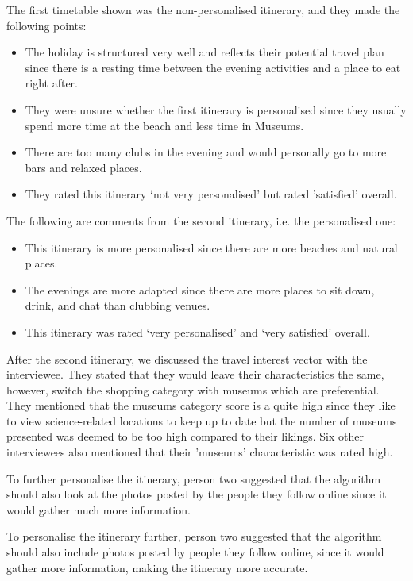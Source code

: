 The first timetable shown was the
non-personalised itinerary, and they made the following points:
\begin{itemize}
\item The holiday is structured very well and reflects their potential travel plan since there is a resting time between the evening activities and a place to eat right after.
\item They were unsure whether the first itinerary is personalised since they usually spend more time at the beach and less time in Museums.
\item There are too many clubs in the evening and would personally go to more bars and relaxed places.
\item They rated this itinerary `not very personalised' but rated 'satisfied' overall. 

\end{itemize}
The following are comments from the second itinerary, i.e. the personalised one:
\begin{itemize}
\item This itinerary is more personalised since there are more beaches and natural places.
\item The evenings are more adapted since there are more places to sit down, drink, and chat than clubbing venues.
\item This itinerary was rated `very personalised' and `very satisfied' overall. 
\end{itemize}

After the second itinerary, we discussed the travel interest vector with the
interviewee. They stated that they would leave their characteristics the same,
however, switch the shopping category with museums which are preferential. They
mentioned that the museums category score is a quite high since they like to
view science-related locations to keep up to date but the number of museums
presented was deemed to be too high compared to their likings. Six other
interviewees also mentioned that their ’museums’ characteristic was rated high.

To further personalise the itinerary, person two suggested that the algorithm
should also look at the photos posted by the people they follow online since it
would gather much more information. 

To personalise the itinerary further, person two suggested that the algorithm
should also include photos posted by people they follow online, since it would
gather more information, making the itinerary more accurate.


